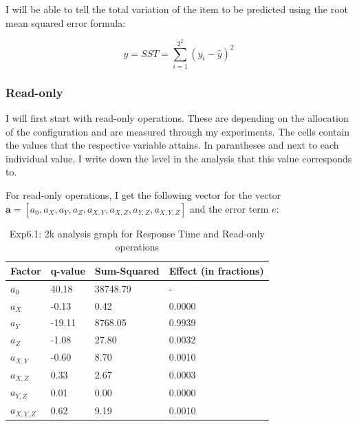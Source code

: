 \documentclass[11pt,a4paper]{article}
\begin{document}
I will be able to tell the total variation of the item to be predicted using the root mean squared error formula:


\begin{equation}
y = SST = \sum_{i=1}^{2^2} (y_i - \hat{y} )^2
\end{equation}


\subsubsection{Read-only}

I will first start with read-only operations.
These are depending on the allocation of the configuration and are measured through my experiments.
The cells contain the values that the respective variable attains.
In parantheses and next to each individual value, I write down the level in the analysis that this value corresponds to.


For read-only operations, I get the following vector for the vector $\mathbf{a} = 
[a_0, a_X, a_Y, a_Z, a_{X, Y}, a_{X, Z}, a_{Y, Z}, a_{X, Y, Z}] $ and the error term $e$:


\begin{center}
	\begin{table}[H]
	\center
    \begin{tabular}{ | l | l | l | l |  }
    \hline
    Factor & q-value & Sum-Squared & Effect (in fractions) \\ \hline
    $a_0$ & 40.18 & 38748.79 & - \\ \hline
    $a_X$ & -0.13 & 0.42 & 0.0000 \\ \hline
    $a_Y$ & -19.11 & 8768.05 & 0.9939 \\ \hline
    $a_Z$ & -1.08  & 27.80 & 0.0032 \\ \hline
   	$a_{X, Y}$ & -0.60 & 8.70 & 0.0010 \\ \hline
    $a_{X, Z}$ & 0.33 & 2.67 & 0.0003 \\ \hline
    $a_{Y, Z}$ & 0.01 & 0.00 & 0.0000 \\ \hline
    $a_{X, Y, Z}$ & 0.62 & 9.19 & 0.0010 \\
    \hline
    \end{tabular}
  	\caption{Exp6.1: 2k analysis graph for Response Time and Read-only operations}	 
  	\end{table}  
\end{center}
\end{document}
